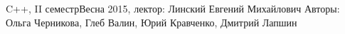 


\BigHeader
	{C++, II семестр}{Весна 2015, лектор: Линский Евгений Михайлович}
	{Авторы: Ольга Черникова, Глеб Валин, Юрий Кравченко, Дмитрий Лапшин}

 








